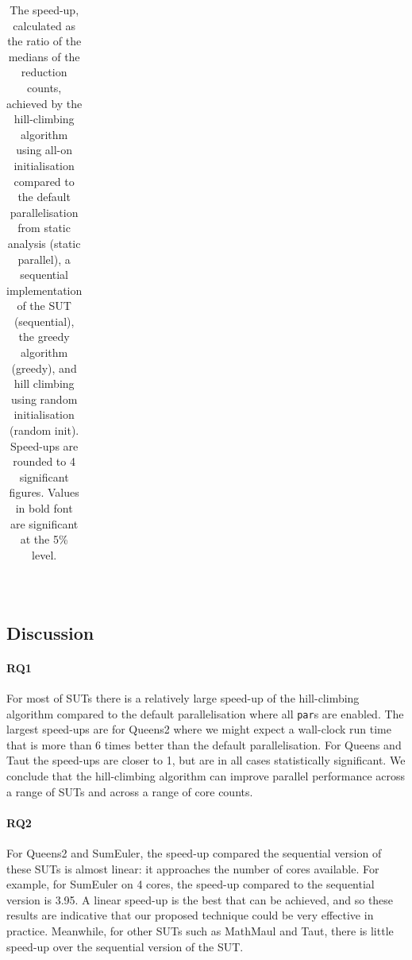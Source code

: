 \begin{table}
\begin{tabular}{c|c|S|S|S|S}
\end{tabular}\\
\smallskip
\caption{The speed-up, calculated as the ratio of the medians of the reduction counts, achieved by the hill-climbing algorithm using all-on initialisation compared to the default parallelisation from static analysis (static parallel), a sequential implementation of the SUT (sequential), the greedy algorithm (greedy), and hill climbing using random initialisation (random init).  Speed-ups are rounded to 4 significant figures.  Values in bold font are significant at the 5\% level.}
\label{tab:speedups}
\end{table}

\subsection{Discussion}

\paragraph{RQ1} For most of SUTs there is a relatively large speed-up of the hill-climbing algorithm compared to the default parallelisation where all \verb-par-s are enabled.  The largest speed-ups are for Queens2 where we might expect a wall-clock run time that is more than 6 times better than the default parallelisation.  For Queens and Taut
the speed-ups are closer to 1, but are in all cases statistically significant. %
We conclude that the hill-climbing algorithm can improve parallel performance across a range of SUTs and across a range of core counts.

\paragraph{RQ2} For Queens2 and SumEuler, the speed-up compared the sequential version of these SUTs is almost linear: it approaches the number of cores available.  For example, for SumEuler on 4 cores, the speed-up compared to the sequential version is 3.95.  A linear speed-up is the best that can be achieved, and so these results are indicative that our proposed technique could be very effective in practice.  Meanwhile, for other SUTs such as MathMaul and Taut, there is little speed-up over the sequential version of the SUT. %

